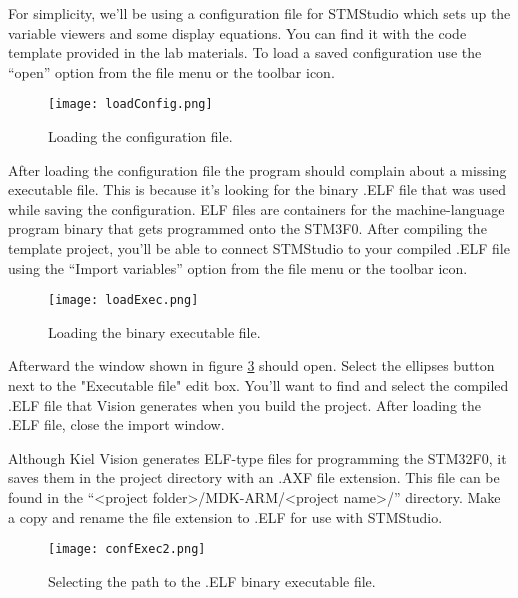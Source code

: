 \documentclass[openany,11pt,fleqn]{book} %
\begin{document}
\noindent For simplicity, we'll be using a configuration file for STMStudio which sets up the variable viewers and some display equations. You can find it with the code template provided in the lab materials. To load a saved configuration use the ``open'' option from the file menu or the toolbar icon.


\begin{figure}[tb]
    \centering\texttt{[image: loadConfig.png]}
    \caption{Loading the configuration file.}
    \label{loadConfig}
\end{figure}

After loading the configuration file the program should complain about a missing executable file. This is because it's looking for the binary .ELF file that was used while saving the configuration. ELF files are containers for the machine-language program binary that gets programmed onto the STM3F0. After compiling the template project, you'll be able to connect STMStudio to your compiled .ELF file using the ``Import variables'' option from the file menu or the toolbar icon.




\begin{figure}[tb]
    \centering\texttt{[image: loadExec.png]}
    \caption{Loading the binary executable file.}
    \label{loadExec}
\end{figure}


Afterward the window shown in figure \ref{confExec} should open. Select the ellipses button next to the "Executable file" edit box. You'll want to find and select the compiled .ELF file that {\textmu}Vision generates when you build the project. After loading the .ELF file, close the import window.

\begin{warning}
Although Kiel {\textmu}Vision generates ELF-type files for programming the STM32F0, it saves them in the project directory with an .AXF file extension. This file can be found in the ``<project folder>/MDK-ARM/<project name>/'' directory. Make a copy and rename the file extension to .ELF for use with STMStudio. 
\end{warning}




\begin{figure}[tb]
    \centering\texttt{[image: confExec2.png]}
    \caption{Selecting the path to the .ELF binary executable file.}
    \label{confExec}
\end{figure}
\end{document}
